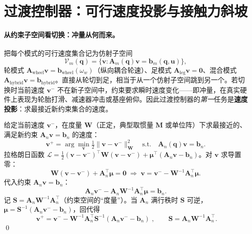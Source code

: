 \section{过渡控制器：可行速度投影与接触力斜坡}
\label{sec:wlm-transition}

\paragraph{从约束子空间看切换：冲量从何而来。}
把每个模式的可行速度集合记为仿射子空间
\begin{equation}
  \mathcal V_m(\mathbf q)=\{\mathbf v:\mathbf A_m(\mathbf q)\mathbf v=\mathbf b_m(\mathbf q,\mathbf u)\},
  \label{eq:wlm-feasible}
\end{equation}
轮模式 $\mathbf A_{\mathrm{wheel}}\mathbf v=\mathbf b_{\mathrm{wheel}}(\omega_w)$（纵向耦合轮速）、足模式 $\mathbf A_{\mathrm{leg}}\mathbf v=\mathbf0$、混合模式 $\mathbf A_{\mathrm{hybrid}}\mathbf v=\mathbf b_{\mathrm{hybrid}}$。直接从轮切到足，相当于从一个仿射子空间跳到另一个。若切换时当前速度 $\mathbf v^-$ 不在新子空间中，约束要求瞬时速度变化——即冲量，在真实硬件上表现为轮胎打滑、减速器冲击或基座俯仰。因此过渡控制器的\emph{第一}任务是\textbf{速度投影}：求最接近新约束集合的速度。

\begin{derivation}
给定当前速度 $\mathbf v^-$，在度量 $\mathbf W$（正定，典型取惯量 $\mathbf M$ 或单位阵）下求最接近的、满足新约束 $\mathbf A_n\mathbf v=\mathbf b_n$ 的速度：
\begin{equation}
  \mathbf v^+=\arg\min_{\mathbf v}\tfrac12\|\mathbf v-\mathbf v^-\|_{\mathbf W}^2
  \quad\text{s.t.}\quad\mathbf A_n(\mathbf q)\mathbf v=\mathbf b_n.
  \label{eq:wlm-proj-problem}
\end{equation}
拉格朗日函数 $\mathcal L=\tfrac12(\mathbf v-\mathbf v^-)^\top\mathbf W(\mathbf v-\mathbf v^-)+\boldsymbol\mu^\top(\mathbf A_n\mathbf v-\mathbf b_n)$。对 $\mathbf v$ 求导置零：
\begin{equation}
  \mathbf W(\mathbf v-\mathbf v^-)+\mathbf A_n^\top\boldsymbol\mu=\mathbf0
  \;\Longrightarrow\;
  \mathbf v=\mathbf v^--\mathbf W^{-1}\mathbf A_n^\top\boldsymbol\mu.
\end{equation}
代入约束 $\mathbf A_n\mathbf v=\mathbf b_n$：
\begin{equation}
  \mathbf A_n\mathbf v^--\mathbf A_n\mathbf W^{-1}\mathbf A_n^\top\boldsymbol\mu=\mathbf b_n.
\end{equation}
记 $\mathbf S=\mathbf A_n\mathbf W^{-1}\mathbf A_n^\top$（约束空间的“度量”）。当 $\mathbf A_n$ 满行秩时 $\mathbf S$ 可逆，$\boldsymbol\mu=\mathbf S^{-1}(\mathbf A_n\mathbf v^--\mathbf b_n)$，回代得
\begin{equation}
  \boxed{\;\mathbf v^+=\mathbf v^--\mathbf W^{-1}\mathbf A_n^\top\mathbf S^{-1}(\mathbf A_n\mathbf v^--\mathbf b_n)\;},\qquad\mathbf S=\mathbf A_n\mathbf W^{-1}\mathbf A_n^\top.
  \label{eq:wlm-proj}
\end{equation}
\qed
\end{derivation}

